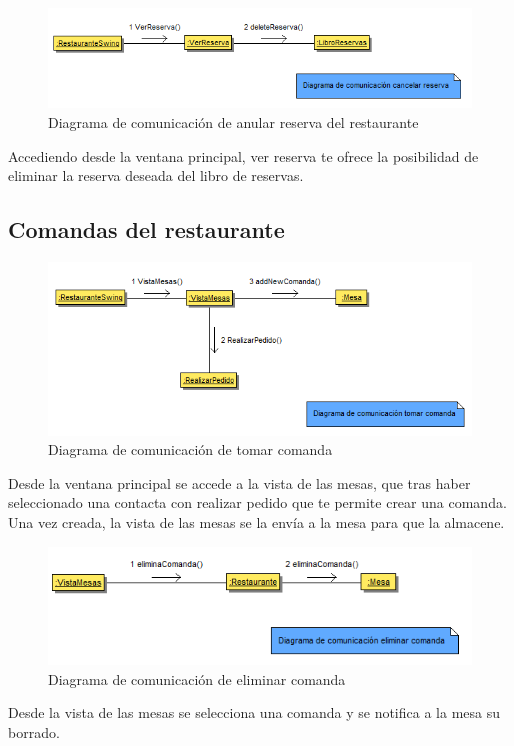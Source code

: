 \documentclass[spanish,a4paper,11pt, twoside]{report}	%
\begin{document}
		\begin{figure}[!h]
		\centering
		\includegraphics[scale=0.5]{DCeliminarreserva.png}
 		\caption{Diagrama de comunicación de anular reserva del restaurante}
		\end{figure}
		Accediendo desde la ventana principal, ver reserva te ofrece la posibilidad de eliminar la reserva deseada del libro de reservas.

		\subsection{Comandas del restaurante}

		\begin{figure}[!h]
		\centering
		\includegraphics[scale=0.5]{DCcomanda.png}
		\caption{Diagrama de comunicación de tomar comanda}
		\end{figure}
		Desde la ventana principal se accede a la vista de las mesas, que tras haber seleccionado una contacta con realizar
		pedido que te permite crear una comanda. Una vez creada, la vista de las mesas se la envía a la mesa para que la almacene.

		\begin{figure}[!h]
		\centering
		\includegraphics[scale=0.5]{DCeliminarcomanda.png}
		\caption{Diagrama de comunicación de eliminar comanda}
		\end{figure}
		Desde la vista de las mesas se selecciona una comanda y se notifica a la mesa su borrado.
\end{document}
